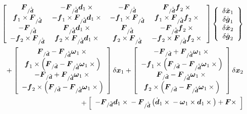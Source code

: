\documentclass[10pt,dvips,fleqn]{report}
\newcommand{\T}[1]{\boldsymbol{#1}}
\begin{document}
\begin{eqnarray*}
	\sqbr{\matr{cccc}{
		\T{F}_{/\dot{\tilde{\T{d}}}} & -\T{F}_{/\dot{\tilde{\T{d}}}} \T{d}_1\times{} &
			- \T{F}_{/\dot{\tilde{\T{d}}}} & \T{F}_{/\dot{\tilde{\T{d}}}} \T{f}_2\times{} \\
		\T{f}_1 \times \T{F}_{/\dot{\tilde{\T{d}}}} &
			- \T{f}_1 \times \T{F}_{/\dot{\tilde{\T{d}}}} \T{d}_1\times{} &
			- \T{f}_1 \times \T{F}_{/\dot{\tilde{\T{d}}}} &
			\T{f}_1 \times \T{F}_{/\dot{\tilde{\T{d}}}} \T{f}_2\times{} \\
		- \T{F}_{/\dot{\tilde{\T{d}}}} & \T{F}_{/\dot{\tilde{\T{d}}}} \T{d}_1\times{} &
			\T{F}_{/\dot{\tilde{\T{d}}}} & - \T{F}_{/\dot{\tilde{\T{d}}}} \T{f}_2\times{} \\
		- \T{f}_2 \times \T{F}_{/\dot{\tilde{\T{d}}}} &
			\T{f}_2 \times \T{F}_{/\dot{\tilde{\T{d}}}} \T{d}_1\times{} &
			\T{f}_2 \times \T{F}_{/\dot{\tilde{\T{d}}}} &
			- \T{f}_2 \times \T{F}_{/\dot{\tilde{\T{d}}}} \T{f}_2\times{}
	}} \cubr{\cvvect{
		\delta\dot{\T{x}}_1 \\
		\delta\dot{\T{g}}_1 \\
		\delta\dot{\T{x}}_2 \\
		\delta\dot{\T{g}}_2
	}} & & \\
	\mbox{} + \sqbr{\cvvect{
		\T{F}_{/\tilde{\T{d}}} - \T{F}_{/\dot{\tilde{\T{d}}}} \T{\omega}_1 \times{} \\
		\T{f}_1 \times \plbr{\T{F}_{/\tilde{\T{d}}} - \T{F}_{/\dot{\tilde{\T{d}}}} \T{\omega}_1 \times{}} \\
		- \T{F}_{/\tilde{\T{d}}} + \T{F}_{/\dot{\tilde{\T{d}}}} \T{\omega}_1 \times{} \\
		- \T{f}_2 \times \plbr{\T{F}_{/\tilde{\T{d}}} - \T{F}_{/\dot{\tilde{\T{d}}}} \T{\omega}_1 \times{}}
	}} \delta\T{x}_1 + \sqbr{\cvvect{
		- \T{F}_{/\tilde{\T{d}}} + \T{F}_{/\dot{\tilde{\T{d}}}} \T{\omega}_1 \times{} \\
		- \T{f}_1 \times \plbr{\T{F}_{/\tilde{\T{d}}} - \T{F}_{/\dot{\tilde{\T{d}}}} \T{\omega}_1 \times{}} \\
		\T{F}_{/\tilde{\T{d}}} - \T{F}_{/\dot{\tilde{\T{d}}}} \T{\omega}_1 \times{} \\
		\T{f}_2 \times \plbr{\T{F}_{/\tilde{\T{d}}} - \T{F}_{/\dot{\tilde{\T{d}}}} \T{\omega}_1 \times{}}
	}} \delta\T{x}_2 & & \\
	\mbox{} + \sqbr{\cvvect{
		- \T{F}_{/\tilde{\T{d}}} \T{d}_1 \times{}
		- \T{F}_{/\dot{\tilde{\T{d}}}} \plbr{
			\dot{\T{d}}_1 \times{} - \T{\omega}_1 \times \T{d}_1\times{}
		} + \T{F}\times \\
}}
\end{eqnarray*}
\end{document}
